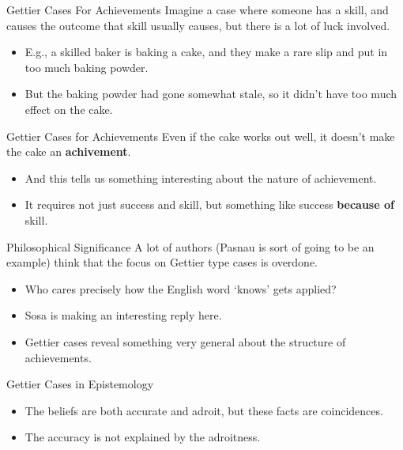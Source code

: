 \documentclass[
  17pt,
  letterpaper,
  ignorenonframetext,
  aspectratio=169,
  handout]{beamer}
\providecommand{\tightlist}{%
  \setlength{\itemsep}{0pt}\setlength{\parskip}{0pt}}\usepackage{longtable,booktabs,array}
\begin{document}
\begin{frame}{Gettier Cases For Achievements}
\protect\hypertarget{gettier-cases-for-achievements}{}
Imagine a case where someone has a skill, and causes the outcome that
skill usually causes, but there is a lot of luck involved.

\begin{itemize}[<+->]
\tightlist
\item
  E.g., a skilled baker is baking a cake, and they make a rare slip and
  put in too much baking powder.
\item
  But the baking powder had gone somewhat stale, so it didn't have too
  much effect on the cake.
\end{itemize}
\end{frame}

\begin{frame}{Gettier Cases for Achievements}
\protect\hypertarget{gettier-cases-for-achievements-1}{}
Even if the cake works out well, it doesn't make the cake an
\textbf{achivement}.

\begin{itemize}[<+->]
\tightlist
\item
  And this tells us something interesting about the nature of
  achievement.
\item
  It requires not just success and skill, but something like success
  \textbf{because of} skill.
\end{itemize}
\end{frame}

\begin{frame}{Philosophical Significance}
\protect\hypertarget{philosophical-significance}{}
A lot of authors (Pasnau is sort of going to be an example) think that
the focus on Gettier type cases is overdone.

\begin{itemize}[<+->]
\tightlist
\item
  Who cares precisely how the English word `knows' gets applied?
\item
  Sosa is making an interesting reply here.
\item
  Gettier cases reveal something very general about the structure of
  achievements.
\end{itemize}
\end{frame}

\begin{frame}{Gettier Cases in Epistemology}
\protect\hypertarget{gettier-cases-in-epistemology}{}
\begin{itemize}[<+->]
\tightlist
\item
  The beliefs are both accurate and adroit, but these facts are
  coincidences.
\item
  The accuracy is not explained by the adroitness.
\end{itemize}
\end{frame}
\end{document}
